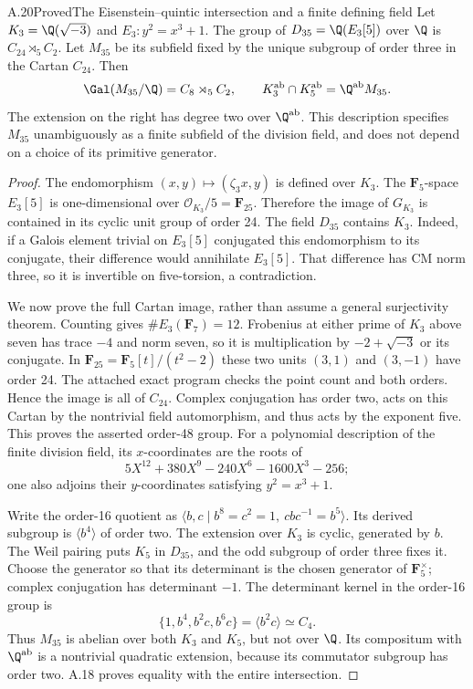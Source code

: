 \begin{statement}{A.20}{Proved}{The Eisenstein--quintic intersection and a finite defining field}
Let $K_3=\Q(\sqrt{-3})$ and $E_3:y^2=x^3+1$. The group of
$D_{35}=\Q(E_3[5])$ over $\Q$ is $C_{24}\rtimes_5 C_2$.
Let $M_{35}$ be its subfield fixed by the unique subgroup of
order three in the Cartan $C_{24}$. Then
\[
 \Gal(M_{35}/\Q)=C_8\rtimes_5 C_2,\qquad
 K_3^{\mathrm{ab}}\cap K_5^{\mathrm{ab}}
                    =\Q^{\mathrm{ab}}M_{35}.
\]
The extension on the right has degree two over $\Q^{\mathrm{ab}}$.
This description specifies $M_{35}$ unambiguously as a finite
subfield of the division field, and does not depend on a choice
of its primitive generator.
\end{statement}
\begin{proof}
The endomorphism $(x,y)\mapsto(\zeta_3x,y)$ is defined over $K_3$.
The $\mathbf F_5$-space $E_3[5]$ is one-dimensional over
$\mathcal O_{K_3}/5=\mathbf F_{25}$. Therefore the image of
$G_{K_3}$ is contained in its cyclic unit group of order 24.
The field $D_{35}$ contains $K_3$. Indeed, if a Galois element
trivial on $E_3[5]$ conjugated this endomorphism to its conjugate,
their difference would annihilate $E_3[5]$. That difference has
CM norm three, so it is invertible on five-torsion, a contradiction.

We now prove the full Cartan image, rather than assume a general
surjectivity theorem. Counting gives $\#E_3(\mathbf F_7)=12$.
Frobenius at either prime of $K_3$ above seven has trace $-4$
and norm seven, so it is multiplication by $-2+\sqrt{-3}$ or its
conjugate. In $\mathbf F_{25}=\mathbf F_5[t]/(t^2-2)$ these two
units $(3,1)$ and $(3,-1)$ have order 24. The attached exact
program checks the point count and both orders. Hence the image
is all of $C_{24}$. Complex conjugation has order two, acts on
this Cartan by the nontrivial field automorphism, and thus acts
by the exponent five. This proves the asserted order-48 group.
For a polynomial description of the finite division field, its
$x$-coordinates are the roots of
\[
       5X^{12}+380X^9-240X^6-1600X^3-256;
\]
one also adjoins their $y$-coordinates satisfying $y^2=x^3+1$.

Write the order-16 quotient as
$\langle b,c\mid b^8=c^2=1,\ cbc^{-1}=b^5\rangle$.
Its derived subgroup is $\langle b^4\rangle$ of order two.
The extension over $K_3$ is cyclic, generated by $b$.
The Weil pairing puts $K_5$ in $D_{35}$, and the odd subgroup
of order three fixes it. Choose the generator so that its
determinant is the chosen generator of $\mathbf F_5^\times$;
complex conjugation has determinant $-1$. The determinant kernel
in the order-16 group is
\[
       \{1,b^4,b^2c,b^6c\}=\langle b^2c\rangle\simeq C_4.
\]
Thus $M_{35}$ is abelian over both $K_3$ and $K_5$, but not over
$\Q$. Its compositum with $\Q^{\mathrm{ab}}$ is a nontrivial
quadratic extension, because its commutator subgroup has order
two. A.18 proves equality with the entire intersection.
\end{proof}

